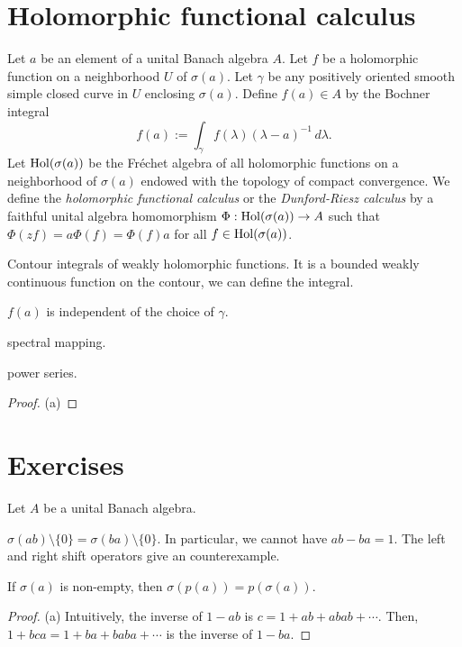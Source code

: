 \documentclass{../../large}
\begin{document}
\begin{prb}
\end{prb}


\section{Holomorphic functional calculus}


\begin{prb}
Let $a$ be an element of a unital Banach algebra $A$.
Let $f$ be a holomorphic function on a neighborhood $U$ of $\sigma(a)$.
Let $\gamma$ be any positively oriented smooth simple closed curve in $U$ enclosing $\sigma(a)$.
Define $f(a)\in A$ by the Bochner integral
\[f(a):=\int_\gamma f(\lambda)(\lambda-a)^{-1}\,d\lambda.\]
Let $\operatorname{Hol}(\sigma(a))$ be the Fr\'echet algebra of all holomorphic functions on a neighborhood of $\sigma(a)$ endowed with the topology of compact convergence.
We define the \emph{holomorphic functional calculus} or the \emph{Dunford-Riesz calculus} by a faithful unital algebra homomorphism $\Phi:\operatorname{Hol}(\sigma(a))\to A$ such that $\Phi(zf)=a\Phi(f)=\Phi(f)a$ for all $f\in\operatorname{Hol}(\sigma(a))$.

Contour integrals of weakly holomorphic functions.
It is a bounded weakly continuous function on the contour, we can define the integral.


\begin{parts}
\item $f(a)$ is independent of the choice of $\gamma$.
\item spectral mapping.
\item power series.
\end{parts}
\end{prb}
\begin{proof}
(a)


\end{proof}

\section*{Exercises}
\begin{prb}
Let $A$ be a unital Banach algebra.
\begin{parts}
\item $\sigma(ab)\setminus\{0\}=\sigma(ba)\setminus\{0\}$. In particular, we cannot have $ab-ba=1$. The left and right shift operators give an counterexample.
\item If $\sigma(a)$ is non-empty, then $\sigma(p(a))=p(\sigma(a))$.
\end{parts}
\end{prb}
\begin{proof}
(a)
Intuitively, the inverse of $1-ab$ is $c=1+ab+abab+\cdots$.
Then, $1+bca=1+ba+baba+\cdots$ is the inverse of $1-ba$.
\end{proof}
\end{document}
